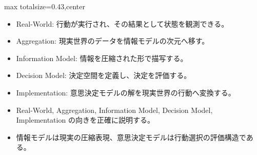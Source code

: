 \clearpage
{}
\begin{minipage}[t]{0.405\textwidth}
\begin{adjustbox}{max totalsize={\textwidth}{0.43\textheight},center}
\begin{minipage}{\textwidth}\scriptsize
{}\begin{itemize}
\item Real-World: 行動が実行され、その結果として状態を観測できる。
\item Aggregation: 現実世界のデータを情報モデルの次元へ移す。
\item Information Model: 情報を圧縮された形で描写する。
\item Decision Model: 決定空間を定義し、決定を評価する。
\item Implementation: 意思決定モデルの解を現実世界の行動へ変換する。
\end{itemize}\begin{itemize}
\item Real-World, Aggregation, Information Model, Decision Model, Implementation の向きを正確に説明する。
\item 情報モデルは現実の圧縮表現、意思決定モデルは行動選択の評価構造である。
\end{itemize}
\end{minipage}
\end{adjustbox}
\end{minipage}\hfill
